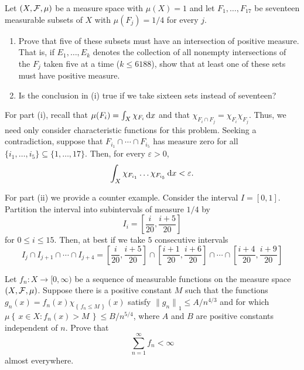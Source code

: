 \begin{problem}
  Let $(X,\mathcal{F},\mu)$ be a measure space with $\mu(X)=1$ and let
  $F_1,\ldots,F_{17}$ be seventeen measurable subsets of $X$ with
  $\mu(F_j)=1/4$ for every $j$.
  \begin{enumerate}[label=(\roman*),noitemsep]
  \item Prove that five of these subsets must have an intersection of
    positive measure. That is, if $E_1,\ldots,E_k$ denotes the collection
    of all nonempty intersections of the $F_j$ taken five at a time ($k\leq
    6188$), show that at least one of these sets must have positive
    measure.
  \item Is the conclusion in (i) true if we take sixteen sets instead of
    seventeen?
  \end{enumerate}
\end{problem}
\begin{solution}
  For part (i), recall that $\mu(F_i)=\int_X\chi_{F_i}\mathop{}\!\mathrm{d} x$ and that
  $\chi_{F_i\cap F_j}=\chi_{F_i}\chi_{F_j}$. Thus, we need only consider
  characteristic functions for this problem. Seeking a contradiction,
  suppose that $F_{i_1}\cap\cdots\cap F_{i_5}$ has measure zero for all
  $\{i_1,\ldots,i_5\}\subseteq\{1,\ldots,17\}$. Then, for every
  $\varepsilon>0$,
  \[
    \int_X\chi_{F_{i_1}}\ldots\chi_{F_{i_5}}\mathop{}\!\mathrm{d} x<\varepsilon.
  \]

  For part (ii) we provide a counter example. Consider the interval
  $I=[0,1]$. Partition the interval into subintervals of measure $1/4$ by
  \[
    I_i=\left[\frac{i}{20},\frac{i+5}{20}\right]
  \]
  for $0\leq i\leq 15$. Then, at best if we take $5$ consecutive intervals
  \[
    I_{j}\cap I_{j+1}\cap\cdots\cap I_{j+4}
    =\left[\frac{i}{20},\frac{i+5}{20}\right]\cap
    \left[\frac{i+1}{20},\frac{i+6}{20}\right]\cap\cdots\cap
    \left[\frac{i+4}{20},\frac{i+9}{20}\right]
  \]
\end{solution}

\begin{problem}
  Let $f_n\colon X\to[0,\infty)$ be a sequence of measurable functions on
  the measure space $(X,\mathcal{F},\mu)$. Suppose there is a positive constant
  $M$ such that the functions
  $g_n(x)=f_n (x)\chi_{\left\{\,f_n\leq M\,\right\}}(x)$ satisfy
  ${\|g_n\|}_1\leq A/n^{4/3}$ and for which
  $\mu\left\{\,x\in X:f_n(x)>M\,\right\}\leq B/n^{5/4}$, where $A$ and $B$
  are positive constants independent of $n$. Prove that
  \[
    \sum_{n=1}^\infty f_n<\infty
  \]
  almost everywhere.
\end{problem}
\begin{solution}
\end{solution}

